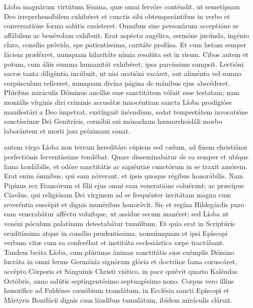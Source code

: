 \documentclass[fontsize=9pt,paper=A6,twoside,BCOR=1mm,DIV=22,headinclude]{scrarticle}
\begin{document}
\begin{multicols}{2}
\RVViv

 Líoba magnárum virtútum fémina, quæ omni fervóre conténdit, ut semetípsam Deo irreprehensíbilem exhibéret et cunctis sibi obtemperántibus in verbo et conversatióne forma salútis exsísteret. Omnibus sine personárum acceptióne se affábilem ac benévolam exhíbuit. Erat aspéctu angélica, sermóne jucúnda, ingénio clara, consílio próvida, spe patientíssima, caritáte profúsa. Et cum lætam semper fáciem præférret, numquam hilaritáte nímia resolúta est in risum. Cibos autem et potum, cum áliis summa humanitát exhibéret, ipsa parcíssime sumpsit. Lectióni sacræ tanta diligéntia incúbuit, ut nisi oratióni vacáret, aut aliménto vel somno corpúsculum refíceret, numquam divína página de mánibus ejus abscéderet. Plúribus miráculis Dóminus ancíllæ suæ sanctitátem vóluit esse testatam; nam moniális vírginis diri críminis accusátæ innocéntiam sancta Líoba prodigióse manifestári a Deo ímpetrat, exstínguit inćendium, sedat tempestátem invocatióne sanctíssimæ Dei Genitrícis, cœnóbii sui mónacham hæmorrhoidáli morbo laborántem et morti jam próximam sanat.

\RVVv

 autem virgo Líoba non terram hereditáre cúpiens sed cælum, ad finem christiánæ perfectiónis ferventíssime tendébat. Quare disseminabátur de ea semper et ubíque fama laudábilis, et odóre sanctitátis ac sapiéntiæ cunctórum in se traxit amórem. Erat enim ómnibus, qui eam nóverant, et ipsis quoque régibus honorábilis. Nam Pipínus rex Francórum et fílii ejus omni eam veneratióne coluérunt; ac præcípue Cárolus, qui religiósam Dei vírginem ad se frequénter invitátam magna cum reveréntia suscépit et dignis munéribus honorávit. Sic et regína Hildegárdis puro eam venerabátur afféctu voluítque, ut assídue secum manéret; sed Líoba ut venéni póculum palatínum detestabátur tumúltum. Et quia erat in Scriptúris eruditíssima atque in consílio prudentíssima, nonnúmquam et ipsi Epíscopi verbum vitæ cum ea conferébat et institúta ecclesiástica sæpe tractábant. Tandem beáta Líoba, cum plúrimas ánimas sanctitátis suæ exémplis Dómino lucráta in omni ferme Germánia signórum glória et doctrínæ fama coruscáret, accépto Córporis et Sánguinis Christi viático, in pace quiévit quarto Kaléndas Octóbris, anno salútis septingentésimo septuagésimo nono. Corpus vero illíus honorífice ad Fuldénse cœnóbium translátum, in Ecclésia sancti Epíscopi et Mártyris Bonifácii dignis cum láudibus tumulátum, ibídem miráculis cláruit.

\RVVvi


\end{multicols}
\end{document}
